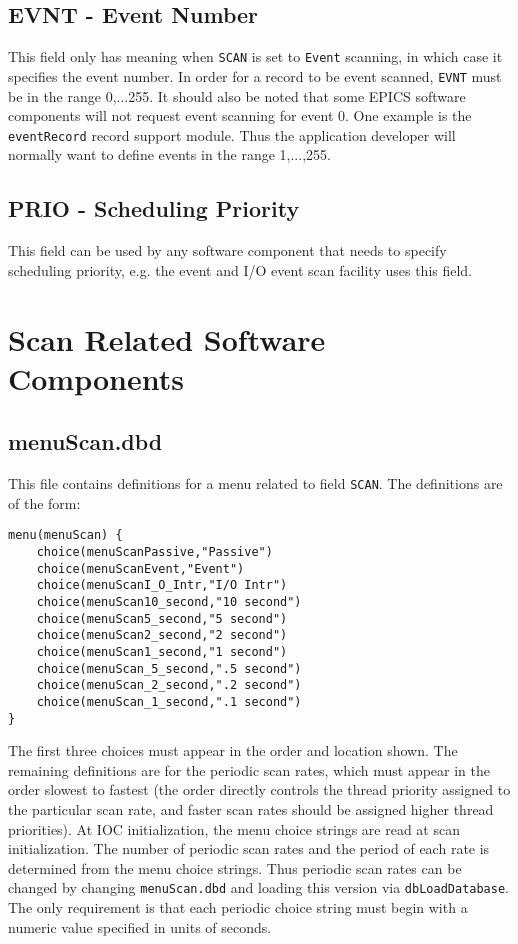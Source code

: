 \subsection{EVNT - Event Number}

This field only has meaning when \verb|SCAN| is set to \verb|Event| scanning, in which case it specifies the event number.
In order for a record to be event scanned, \verb|EVNT| must be in the range 0,...255.
It should also be noted that some EPICS software components will not request event scanning for event 0.
One example is the \verb|eventRecord| record support module.
Thus the application developer will normally want to define events in the range 1,...,255.

\subsection{PRIO - Scheduling Priority }

This field can be used by any software component that needs to specify scheduling priority, e.g. the event and I/O event scan facility uses this field.

\section{Scan Related Software Components}

\subsection{menuScan.dbd}

This file contains definitions for a menu related to field \verb|SCAN|.
The definitions are of the form:

\begin{verbatim}
menu(menuScan) {
    choice(menuScanPassive,"Passive")
    choice(menuScanEvent,"Event")
    choice(menuScanI_O_Intr,"I/O Intr")
    choice(menuScan10_second,"10 second")
    choice(menuScan5_second,"5 second")
    choice(menuScan2_second,"2 second")
    choice(menuScan1_second,"1 second")
    choice(menuScan_5_second,".5 second")
    choice(menuScan_2_second,".2 second")
    choice(menuScan_1_second,".1 second")
}
\end{verbatim}

The first three choices must appear in the order and location shown.
The remaining definitions are for the periodic scan rates, which must appear in the order slowest to fastest (the order directly controls the thread priority assigned to the particular scan rate, and faster scan rates should be assigned higher thread priorities).
At IOC initialization, the menu choice strings are read at scan initialization.
The number of periodic scan rates and the period of each rate is determined from the menu choice strings.
Thus periodic scan rates can be changed by changing \verb|menuScan.dbd| and loading this version via \verb|dbLoadDatabase|.
The only requirement is that each periodic choice string must begin with a numeric value specified in units of seconds.

